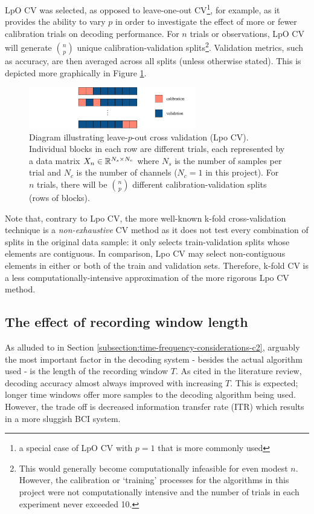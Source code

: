 LpO CV was selected, as opposed to leave-one-out CV\footnote{a special case of LpO CV with $p=1$ that is more commonly used}, for example, as it provides the ability to vary $p$ in order to investigate the effect of more or fewer calibration trials on decoding performance. For $n$ trials or observations, LpO CV will generate $\binom{n}{p}$ unique calibration-validation splits\footnote{This would generally become computationally infeasible for even modest $n$. However, the calibration or `training' processes for the algorithms in this project were not computationally intensive and the number of trials in each experiment never exceeded 10.}. Validation metrics, such as accuracy, are then averaged across all splits (unless otherwise stated). This is depicted more graphically in Figure \ref{fig:lpocv-diagram}.
\begin{figure}[h]
    \centering
    \includegraphics[width=0.65\textwidth]{LpoCV}
    \caption[Leave-$p$-out cross validation (Lpo CV)]{Diagram illustrating leave-$p$-out cross validation (Lpo CV). Individual blocks in each row are different trials, each represented by a data matrix $X_n\in\mathbb{R}^{N_s\times N_c}$ where $N_s$ is the number of samples per trial and $N_c$ is the number of channels ($N_c=1$ in this project). For $n$ trials, there will be $\binom{n}{p}$ different calibration-validation splits (rows of blocks).}
    \label{fig:lpocv-diagram}
\end{figure}
Note that, contrary to Lpo CV, the more well-known k-fold cross-validation technique is a \textit{non-exhaustive} CV method as it does not test every combination of splits in the original data sample: it only selects train-validation splits whose elements are contiguous. In comparison, Lpo CV may select non-contiguous elements in either or both of the train and validation sets. Therefore, k-fold CV is a less computationally-intensive approximation of the more rigorous Lpo CV method. 

\subsection{The effect of recording window length}
\label{subsection:decoding-acc-ns-effect}
As alluded to in Section \ref{subsection:time-frequency-considerations-c2}, arguably the most important factor in the decoding system - besides the actual algorithm used - is the length of the recording window $T$. As cited in the literature review, decoding accuracy almost always improved with increasing $T$. This is expected; longer time windows offer more samples to the decoding algorithm being used. However, the trade off is decreased information transfer rate (ITR) which results in a more sluggish BCI system. 


